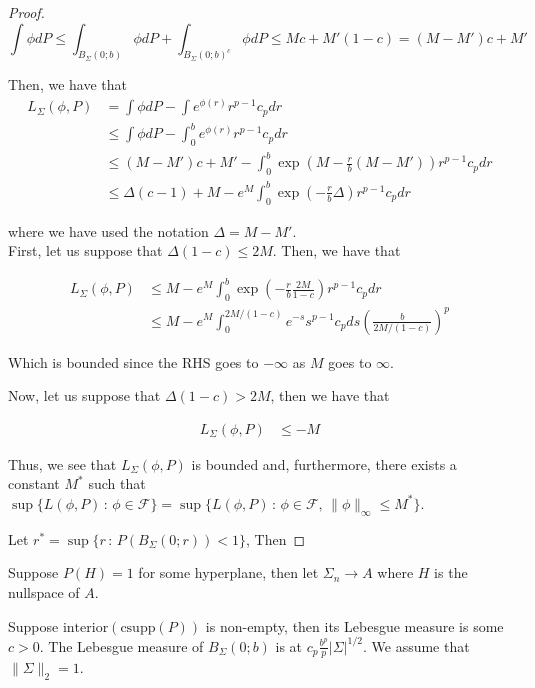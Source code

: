 \documentclass[12pt]{article}
\begin{document}
\begin{proof}
\[ 
 \int \phi dP \leq \int_{B_{\Sigma}(0; b)} \phi dP + \int_{B_{\Sigma}(0; b)^c} \phi dP \leq
     M c + M' (1 - c) = (M - M') c + M'
\]

Then, we have that
\begin{align*}
L_{\Sigma}(\phi, P) &= \int \phi dP - \int e^{\phi(r)} r^{p-1} c_p dr \\
  &\leq \int \phi dP - \int_0^b e^{\phi(r)} r^{p-1} c_p dr \\
  &\leq (M - M')c + M' - \int_0^b \exp(M - \frac{r}{b}(M - M')) r^{p-1} c_p dr  \\
  &\leq \Delta (c - 1) + M - e^M \int_0^b \exp( - \frac{r}{b} \Delta) r^{p-1} c_p dr
\end{align*}

where we have used the notation $\Delta = M - M'$.\\

First, let us suppose that $\Delta (1-c) \leq 2M$. Then, we have that

\begin{align*}
L_{\Sigma}(\phi, P) &\leq M - e^M \int_0^b \exp( - \frac{r}{b} \frac{2M}{1-c} ) r^{p-1} c_p dr \\
   &\leq M - e^M \int_0^{2M/(1-c)} e^{-s} s^{p-1} c_p ds \left( \frac{b}{2M/(1-c)} \right)^p 
\end{align*}

Which is bounded since the RHS goes to $-\infty$ as $M$ goes to $\infty$. 

Now, let us suppose that $\Delta(1-c) > 2M$, then we have that

\begin{align*}
L_{\Sigma}(\phi, P) &\leq -M 
\end{align*}


Thus, we see that $L_{\Sigma}(\phi, P)$ is bounded and, furthermore, there exists a constant $M^*$ such that 
$\sup \{ L(\phi, P) \,:\, \phi \in \mathcal{F} \} = \sup \{ L(\phi, P) \,:\, \phi \in \mathcal{F},\, \|\phi\|_\infty \leq M^* \}$.

Let $r^* = \sup \{ r \,:\, P( B_{\Sigma}(0; r)) < 1\}$, Then 

\end{proof}


Suppose $P(H) = 1$ for some hyperplane, then let $\Sigma_n \rightarrow A$ where $H$ is the nullspace of $A$. 

Suppose $\text{interior}(\text{csupp}(P))$ is non-empty, then its Lebesgue measure is some $c > 0$. The Lebesgue measure of $B_{\Sigma}(0 ; b)$ is at $ c_p \frac{b^p}{p} |\Sigma|^{1/2}$. We assume that $\| \Sigma \|_2 = 1$.
\end{document}
